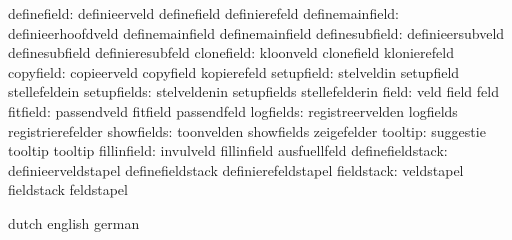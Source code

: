                   definefield:  definieerveld                definefield
                                definierefeld
              definemainfield:  definieerhoofdveld           definemainfield
                                definemainfield %
               definesubfield:  definieersubveld             definesubfield
                                definieresubfeld
                   clonefield:  kloonveld                    clonefield
                                klonierefeld
                    copyfield:  copieerveld                  copyfield
                                kopierefeld
                   setupfield:  stelveldin                   setupfield
                                stellefeldein
                  setupfields:  stelveldenin                 setupfields
                                stellefelderin
                        field:  veld                         field
                                feld
                     fitfield:  passendveld                  fitfield
                                passendfeld
                    logfields:  registreervelden             logfields
                                registrierefelder
                   showfields:  toonvelden                   showfields
                                zeigefelder
                      tooltip:  suggestie                    tooltip
                                tooltip
                  fillinfield:  invulveld                    fillinfield
                                ausfuellfeld
             definefieldstack:  definieerveldstapel          definefieldstack
                                definierefeldstapel
                   fieldstack:  veldstapel                   fieldstack
                                feldstapel

\stopcommands




\startcommands                  dutch                        english
                                german


